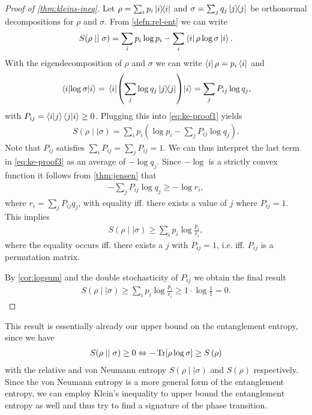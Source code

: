 \begin{proof}[Proof of \cref{thm:kleins-ineq}]
  Let $\rho=\sum_i p_i \dyad{i}$ and $\sigma=\sum_j q_j \dyad{j}$ be
  orthonormal decompositions for $\rho$ and $\sigma$. From \cref{defn:rel-ent}
  we can write
  \begin{align}\label{eq:ke-proof1}
    S(\rho\mid\mid\sigma) = \sum_i p_i \log p_i - \sum_i \bra{i} \rho
    \log\sigma \ket{i}
  .\end{align}
  With the eigendecomposition of $\rho$ and $\sigma$ we can write $\bra{i} \rho = p_i
  \bra{i}$ and
  \begin{align}\label{eq:ke-proof2}
    \expval{\log\sigma}{i} = \expval{\left(\sum_j \log q_j \dyad{j}
    \right)}{i} = \sum_j P_{ij}\log q_j  
  ,\end{align}
  with $P_{ij} = \ip{i}{j}\ip{j}{i} \geq 0$. 
  Plugging this into \cref{eq:ke-proof1} yields
  \begin{align}\label{eq:ke-proof3}
    S(\rho\mid\mid\sigma) = \sum_i p_i \left(\log p_i - \sum_j P_{ij} \log q_j \right)
  .\end{align}
  Note that $P_{ij}$ satisfies $\sum_i P_{ij} = \sum_j P_{ij} = 1$. We can thus
  interpret the last term in \cref{eq:ke-proof3} as an average of $-\log q_j$.
  Since $-\log$ is a strictly convex function it follows from \cref{thm:jensen}
  that
  \begin{align}
    -\sum_j P_{ij} \log q_j \geq - \log r_i
  ,\end{align}
  where $r_i = \sum_j P_{ij} q_j$, with equality iff. there exists a value of
  $j$ where $P_{ij}=1$. This implies 
  \begin{align}
    S(\rho\mid\mid\sigma) \geq \sum_i p_i \log\frac{p_i}{r_i}
  ,\end{align}
  where the equality occurs iff. there exists a $j$ with $P_{ij}=1$, i.e. iff.
  $P_{ij}$ is a permutation matrix.

  By \cref{cor:logsum} and the double stochasticity of $P_{ij}$ we obtain the
  final result
  \begin{align}
     S(\rho\mid\mid\sigma) \geq \sum_i p_i \log\frac{p_i}{r_i} \geq 1\cdot \log
     \frac{1}{1} = 0
  .\end{align}
\end{proof}

This result is essentially already our upper bound on the entanglement entropy,
since we have
\begin{align}
  \label{eq:kleins-ineq}
  S(\rho \mid\mid \sigma) \geq 0 \Leftrightarrow -\Tr[\rho\log\sigma]\geq
  S\left( \rho \right) 
\end{align}
with the relative and von Neumann entropy $S(\rho\mid\mid\sigma)$ and
$S(\rho)$ respectively. Since the von Neumann entropy is a more general form of
the entanglement entropy, we can employ Klein's inequality to upper bound the
entanglement entropy as well and thus try to find a signature of the phase
transition.

